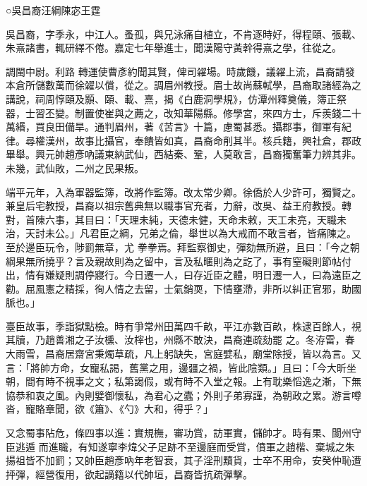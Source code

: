 
\begin{pinyinscope}

 ○吳昌裔汪綱陳宓王霆



 吳昌裔，字季永，中江人。蚤孤，與兄泳痛自植立，不肯逐時好，得程頤、張載、朱熹諸書，輒研繹不倦。嘉定七年舉進士，聞漢陽守黃幹得熹之學，往從之。



 調閩中尉。利路
 轉運使曹彥約聞其賢，俾司糴場。時歲饑，議糴上流，昌裔請發本倉所儲數萬而徐糴以償，從之。調眉州教授。眉士故尚蘇軾學，昌裔取諸經為之講說，祠周惇頤及顥、頤、載、熹，揭《白鹿洞學規》，仿潭州釋奠儀，簿正祭器，士習丕變。制置使崔與之薦之，改知華陽縣。修學宮，來四方士，斥羨錢二十萬緡，買良田備旱。通判眉州，著《苦言》十篇，慮蜀甚悉。攝郡事，御軍有紀律。尋權漢州，故事比攝官，奉饋皆如真，昌裔命削其半。核兵籍，興社倉，郡政
 畢舉。興元帥趙彥吶議東納武仙，西結秦、鞏，人莫敢言，昌裔獨奮筆力辨其非。未幾，武仙敗，二州之民果叛。



 端平元年，入為軍器監簿，改將作監簿。改太常少卿。徐僑於人少許可，獨賢之。兼皇后宅教授，昌裔以祖宗舊典無以職事官充者，力辭，改吳、益王府教授。轉對，首陳六事，其目曰：「天理未純，天德未健，天命未敕，天工未亮，天職未治，天討未公。」凡君臣之綱，兄弟之倫，舉世以為大戒而不敢言者，皆痛陳之。至於邊臣玩令，陟罰無章，尤
 拳拳焉。拜監察御史，彈劾無所避，且曰：「今之朝綱果無所撓乎？言及親故則為之留中，言及私暱則為之訖了，事有窒礙則節帖付出，情有嫌疑則調停寢行。今日遷一人，曰存近臣之體，明日遷一人，曰為遠臣之勸。屈風憲之精採，徇人情之去留，士氣銷耎，下情壅滯，非所以糾正官邪，助國脈也。」



 臺臣故事，季詣獄點檢。時有爭常州田萬四千畝，平江亦數百畝，株逮百餘人，視其牘，乃趙善湘之子汝櫄、汝榟也，州縣不敢決，昌裔連疏劾罷
 之。冬洊雷，春大雨雪，昌裔居齋宮秉燭草疏，凡上躬缺失，宮庭嬖私，廟堂除授，皆以為言。又言：「將帥方命，女寵私謁，舊黨之用，邊疆之禍，皆此陰類。」且曰：「今大昕坐朝，間有時不視事之文；私第謁假，或有時不入堂之報。上有耽樂慆逸之漸，下無協恭和衷之風。內則嬖御懷私，為君心之蠹；外則子弟寡謹，為朝政之累。游言噂沓，寵賂章聞，欲《簫》、《勺》大和，得乎？」



 又念蜀事阽危，條四事以進：實規橅，審功賞，訪軍實，儲帥才。時有果、閬州守臣逃遁
 而進職，有知遂寧李煒父子足跡不至邊庭而受賞，僨軍之趙楷、棄城之朱揚祖皆不加罰；又帥臣趙彥吶年老智衰，其子淫刑黷貨，士卒不用命，安癸仲恥遭抨彈，經營復用，欲起謫籍以代帥垣，昌裔皆抗疏彈擊。




\end{pinyinscope}
